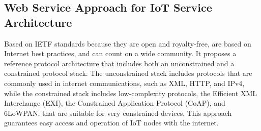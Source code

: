 \documentclass{article}
\begin{document}
\subsection{Web Service Approach for IoT Service Architecture}

Based on IETF standards because they are open and royalty-free, are based on Internet best practices, and can count on a wide community.
It proposes a reference protocol architecture that includes both an unconstrained and a constrained protocol stack. The unconstrained stack includes protocols that are commonly used in internet communications, such as XML, HTTP, and IPv4, while the constrained stack includes low-complexity protocols, the Efficient XML Interchange (EXI), the Constrained Application Protocol (CoAP), and 6LoWPAN, that are suitable for very constrained devices. This approach guarantees easy access and operation of IoT nodes with the internet.
\end{document}
